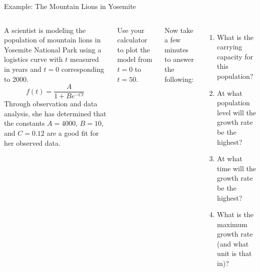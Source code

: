 \documentclass[10pt,aspectratio=1610,xcolor={dvipsnames}]{beamer}
\begin{document}
  \begin{frame}{Example: The Mountain Lions in Yosemite}

    \begin{columns}

      A scientist is modeling the population of mountain lions in Yosemite National Park using a logistics curve with $t$ measured in years and $t=0$ corresponding to 2000.
      \[
        f(t) = \frac{A}{1 + Be^{-Ct}}
      \]
      Through observation and data analysis, she has determined that the constants $A = 4000$, $B = 10$, and $C = 0.12$ are a good fit for her observed data.

      Use your calculator to plot the model from $t = 0$ to $t = 50$.

      Now take a few minutes to answer the following:

      \begin{enumerate}
        \item{What is the carrying capacity for this population?} %
        \item{At what population level will the growth rate be the highest?} %
        \item{At what time will the growth rate be the highest?} %
        \item{What is the maximum growth rate (and what unit is that in)?} %
      \end{enumerate}

    \end{columns}

  \end{frame}
\end{document}
